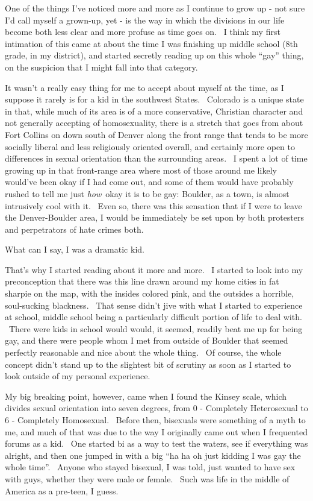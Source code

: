 One of the things I've noticed more and more as I continue to grow up -
not sure I'd call myself a grown-up, yet - is the way in which the
divisions in our life become both less clear and more profuse as time
goes on. ~I think my first intimation of this came at about the time I
was finishing up middle school (8th grade, in my district), and started
secretly reading up on this whole ``gay'' thing, on the suspicion that I
might fall into that category.

It wasn't a really easy thing for me to accept about myself at the time,
as I suppose it rarely is for a kid in the southwest States. ~Colorado
is a unique state in that, while much of its area is of a more
conservative, Christian character and not generally accepting of
homosexuality, there is a stretch that goes from about Fort Collins on
down south of Denver along the front range that tends to be more
socially liberal and less religiously oriented overall, and certainly
more open to differences in sexual orientation than the surrounding
areas. ~I spent a lot of time growing up in that front-range area where
most of those around me likely would've been okay if I had come out, and
some of them would have probably rushed to tell me just \emph{how}~okay
it is to be gay: Boulder, as a town, is almost intrusively cool with it.
~Even so, there was this sensation that if I were to leave the
Denver-Boulder area, I would be immediately be set upon by both
protesters and perpetrators of hate crimes both.

What can I say, I was a dramatic kid.

That's why I started reading about it more and more. ~I started to look
into my preconception that there was this line drawn around my home
cities in fat sharpie on the map, with the insides colored pink, and the
outsides a horrible, soul-sucking blackness. ~That sense didn't jive
with what I started to experience at school, middle school being a
particularly difficult portion of life to deal with. ~There were kids in
school would would, it seemed, readily beat me up for being gay, and
there were people whom I met from outside of Boulder that seemed
perfectly reasonable and nice about the whole thing. ~Of course, the
whole concept didn't stand up to the slightest bit of scrutiny as soon
as I started to look outside of my personal experience.

My big breaking point, however, came when I found the Kinsey scale,
which divides sexual orientation into seven degrees, from 0 - Completely
Heterosexual to 6 - Completely Homosexual. ~Before then, bisexuals were
something of a myth to me, and much of that was due to the way I
originally came out when I frequented forums as a kid. ~One started bi
as a way to test the waters, see if everything was alright, and then one
jumped in with a big ``ha ha oh just kidding I was gay the whole time''.
~Anyone who stayed bisexual, I was told, just wanted to have sex with
guys, whether they were male or female. ~Such was life in the middle of
America as a pre-teen, I guess.


